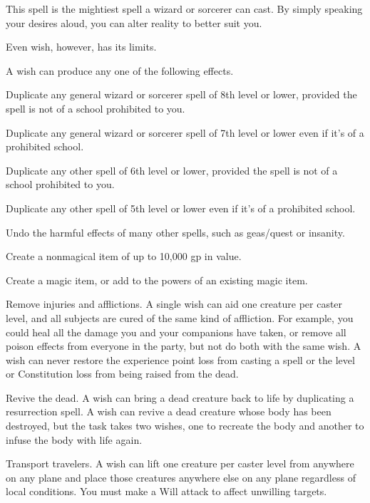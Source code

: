 \begin{spelleffect}
  This spell is the mightiest spell a wizard or sorcerer can cast. By simply speaking your desires aloud, you can alter reality to better suit you.
  \par Even wish, however, has its limits.
  \par A wish can produce any one of the following effects.
  \begin{itemize*}
    \item Duplicate any general wizard or sorcerer spell of 8th level or lower, provided the spell is not of a school prohibited to you.
    \item Duplicate any general wizard or sorcerer spell of 7th level or lower even if it's of a prohibited school.
    \item Duplicate any other spell of 6th level or lower, provided the spell is not of a school prohibited to you.
    \item Duplicate any other spell of 5th level or lower even if it's of a prohibited school. 
    \item Undo the harmful effects of many other spells, such as geas/quest or insanity.
    \item Create a nonmagical item of up to 10,000 gp in value.
    \item Create a magic item, or add to the powers of an existing magic item.
    \item Remove injuries and afflictions. A single wish can aid one creature per caster level, and all subjects are cured of the same kind of affliction. For example, you could heal all the damage you and your companions have taken, or remove all poison effects from everyone in the party, but not do both with the same wish. A wish can never restore the experience point loss from casting a spell or the level or Constitution loss from being raised from the dead.
    \item Revive the dead. A wish can bring a dead creature back to life by duplicating a resurrection spell. A wish can revive a dead creature whose body has been destroyed, but the task takes two wishes, one to recreate the body and another to infuse the body with life again.
    \item Transport travelers. A wish can lift one creature per caster level from anywhere on any plane and place those creatures anywhere else on any plane regardless of local conditions. You must make a Will attack to affect unwilling targets.

\end{itemize*}
\end{spelleffect}
